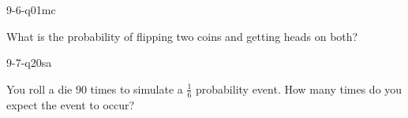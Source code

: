 \begin{practiceQuestion}{9-6-q01}{mc}
\begin{questionText}
What is the probability of flipping two coins and getting heads on both?
\end{questionText}
\end{practiceQuestion}

\begin{practiceQuestion}{9-7-q20}{sa}
\begin{questionText}
You roll a die $90$ times to simulate a $\frac{1}{6}$ probability event. How many times do you expect the event to occur?
\end{questionText}
\end{practiceQuestion}
